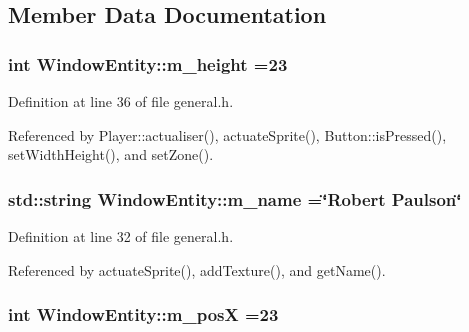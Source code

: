 \subsection{Member Data Documentation}
\hypertarget{class_window_entity_a243612b53cac6fea71040e9daf1da030}{
\subsubsection[{m\-\_\-height}]{\setlength{\rightskip}{0pt plus 5cm}int Window\-Entity\-::m\-\_\-height =23\hspace{0.3cm}{\ttfamily [protected]}}}\label{class_window_entity_a243612b53cac6fea71040e9daf1da030}


Definition at line 36 of file general.\-h.



Referenced by Player\-::actualiser(), actuate\-Sprite(), Button\-::is\-Pressed(), set\-Width\-Height(), and set\-Zone().

\hypertarget{class_window_entity_ae68db7c5aa5f1ad95a6c60091db3d441}{
\subsubsection[{m\-\_\-name}]{\setlength{\rightskip}{0pt plus 5cm}std\-::string Window\-Entity\-::m\-\_\-name =\char`\"{}Robert Paulson\char`\"{}\hspace{0.3cm}{\ttfamily [protected]}}}\label{class_window_entity_ae68db7c5aa5f1ad95a6c60091db3d441}


Definition at line 32 of file general.\-h.



Referenced by actuate\-Sprite(), add\-Texture(), and get\-Name().

\hypertarget{class_window_entity_a68554f69aea32c7a4e12c95e75c2f5cc}{
\subsubsection[{m\-\_\-pos\-X}]{\setlength{\rightskip}{0pt plus 5cm}int Window\-Entity\-::m\-\_\-pos\-X =23\hspace{0.3cm}{\ttfamily [protected]}}}\label{class_window_entity_a68554f69aea32c7a4e12c95e75c2f5cc}


